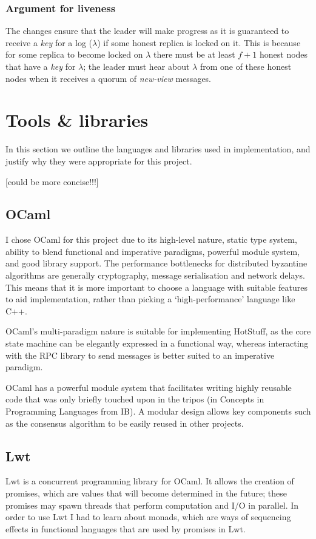 \subsubsection{Argument for liveness}
The changes ensure that the leader will make progress as it is guaranteed to receive a \textit{key} for a log ($\lambda$) if some honest replica is locked on it. This is because for some replica to become locked on $\lambda$ there must be at least $f + 1$ honest nodes that have a \textit{key} for $\lambda$; the leader must hear about $\lambda$ from one of these honest nodes when it receives a quorum of \textit{new-view} messages.

\section{Tools \& libraries} \label{tools}
In this section we outline the languages and libraries used in implementation, and justify why they were appropriate for this project.

[could be more concise!!!]

\subsection{OCaml}
I chose OCaml \cite{ocaml} for this project due to its high-level nature, static type system, ability to blend functional and imperative paradigms, powerful module system, and good library support. The performance bottlenecks for distributed byzantine algorithms are generally cryptography, message serialisation and network delays. This means that it is more important to choose a language with suitable features to aid implementation, rather than picking a `high-performance' language like C++.

OCaml's multi-paradigm nature is suitable for implementing HotStuff, as the core state machine can be elegantly expressed in a functional way, whereas interacting with the RPC library to send messages is better suited to an imperative paradigm.

OCaml has a powerful module system that facilitates writing highly reusable code that was only briefly touched upon in the tripos (in Concepts in Programming Languages from IB). A modular design allows key components such as the consensus algorithm to be easily reused in other projects.

\subsection{Lwt}
Lwt \cite{lwt} is a concurrent programming library for OCaml. It allows the creation of promises, which are values that will become determined in the future; these promises may spawn threads that perform computation and I/O in parallel. In order to use Lwt I had to learn about monads, which are ways of sequencing effects in functional languages that are used by promises in Lwt.


